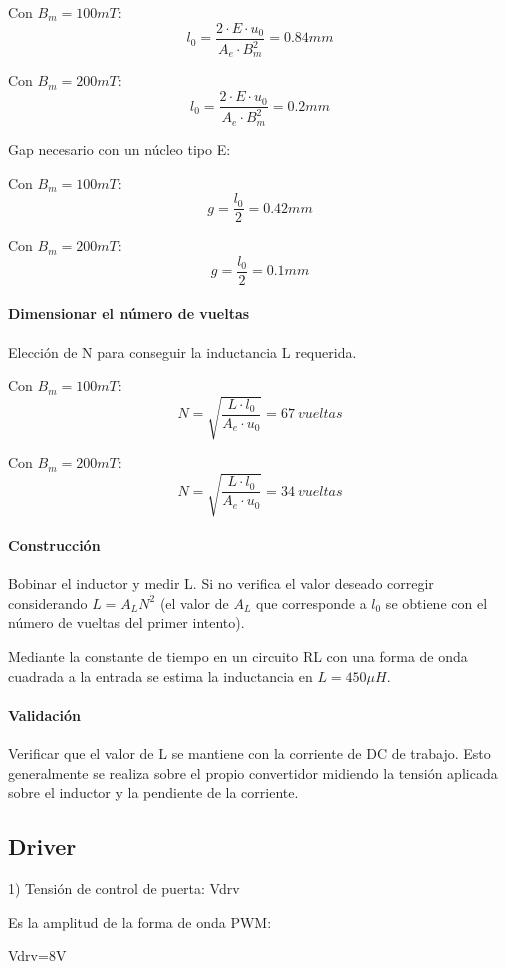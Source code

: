 Con $B_m=100mT$:
$$ l_0=\frac{2\cdot E\cdot u_0}{A_e\cdot B_m^2}=0.84mm $$

Con $B_m=200mT$:
$$ l_0=\frac{2\cdot E\cdot u_0}{A_e\cdot B_m^2}=0.2mm $$

Gap necesario con un núcleo tipo E:

Con $B_m=100mT$:
$$ g=\frac{l_0}{2}=0.42mm $$

Con $B_m=200mT$:
$$ g=\frac{l_0}{2}=0.1mm $$

\paragraph{Dimensionar el número de vueltas}

Elección de N para conseguir la inductancia L requerida.

Con $B_m=100mT$:
$$ N=\sqrt{\frac{L\cdot l_0}{A_e\cdot u_0}}=67\ vueltas$$

Con $B_m=200mT$:
$$ N=\sqrt{\frac{L\cdot l_0}{A_e\cdot u_0}}=34\ vueltas $$

\paragraph{Construcción}

Bobinar el inductor y medir L. Si no verifica el valor deseado corregir
considerando $L = A_LN^2$ (el valor de $A_L$ que corresponde a $l_0$ se obtiene con
el número de vueltas del primer intento).

Mediante la constante de tiempo en un circuito RL con una forma de onda cuadrada a la entrada se estima la inductancia en $L=450\mu H$. 

\paragraph{Validación}

Verificar que el valor de L se mantiene con la corriente de DC de trabajo.
Esto generalmente se realiza sobre el propio convertidor midiendo la
tensión aplicada sobre el inductor y la pendiente de la corriente.

\subsection{Driver}

1) Tensión de control de puerta: Vdrv

Es la amplitud de la forma de onda PWM:  

Vdrv=8V

